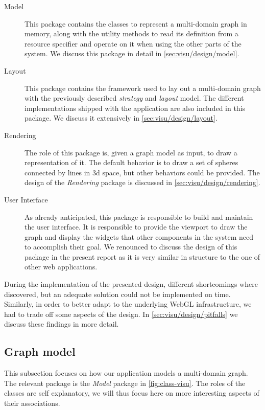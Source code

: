\begin{description}
  \item[Model] This package contains the classes to represent a multi-domain graph in memory, along with the utility methods to read its definition from a resource specifier and operate on it when using the other parts of the system. We discuss this package in detail in \vref{sec:visu/design/model}.
  \item[Layout] This package contains the framework used to lay out a multi-domain graph with the previously described \emph{strategy} and \emph{layout} model. The different implementations shipped with the application are also included in this package. We discuss it extensively in \vref{sec:visu/design/layout}.
  \item[Rendering] The role of this package is, given a graph model as input, to draw a representation of it. The default behavior is to draw a set of spheres connected by lines in \gls{3d} space, but other behaviors could be provided. The design of the \emph{Rendering} package is discussed in \vref{sec:visu/design/rendering}.
  \item[User Interface] As already anticipated, this package is responsible to build and maintain the user interface. It is responsible to provide the viewport to draw the graph and display the widgets that other components in the system need to accomplish their goal. We renounced to discuss the design of this package in the present report as it is very similar in structure to the one of other web applications.
\end{description}

During the implementation of the presented design, different shortcomings where discovered, but an adequate solution could not be implemented on time. Similarly, in order to better adapt to the underlying WebGL infrastructure, we had to trade off some aspects of the design. In \vref{sec:visu/design/pitfalls} we discuss these findings in more detail.

\subsection{Graph model}
\label{sec:visu/design/model}

This subsection focuses on how our application models a multi-domain graph. The relevant package is the \emph{Model} package in \vref{fig:class-visu}. The roles of the classes are self explanatory, we will thus focus here on more interesting aspects of their associations.

